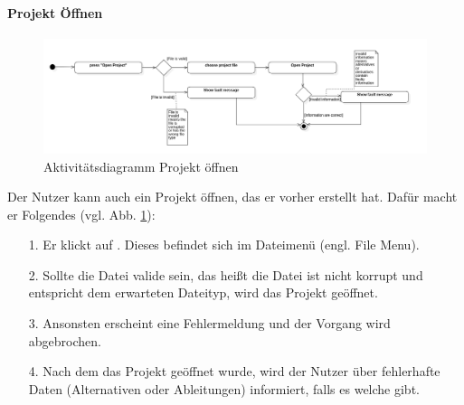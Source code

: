 \documentclass{article}
\newcommand{\guibutton}[1]{\fbox{\texttt{#1}}}
\begin{document}
\paragraph{Projekt Öffnen}\mbox{}
\begin{figure}[H]%
    \centering
    \includegraphics[width=13cm]{docs/entwurf/Entwurf_dokument/img/Alissa/OpenProjectAD.png}
    \caption{Aktivitätsdiagramm Projekt öffnen}
    \label{ADProjektÖffnen}
\end{figure}
Der Nutzer kann auch ein Projekt öffnen, das er vorher erstellt hat. Dafür macht er Folgendes (vgl. Abb. \ref{ADProjektÖffnen}):
\begin{enumerate}
    \item[1.] Er klickt auf \guibutton{Open Project}. Dieses befindet sich im Dateimenü (engl. File Menu).
    \item[2.] Sollte die Datei valide sein, das heißt die Datei ist nicht korrupt und entspricht dem erwarteten Dateityp, wird das Projekt geöffnet.
    \item[3.] Ansonsten erscheint eine Fehlermeldung und der Vorgang wird abgebrochen.
    \item[4.] Nach dem das Projekt geöffnet wurde, wird der Nutzer über fehlerhafte Daten (Alternativen oder Ableitungen) informiert, falls es welche gibt. 
\end{enumerate}
\end{document}
